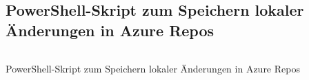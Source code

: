 %
\begin{appendices}
\renewcommand{\thefigure}{\Alph{figure}} %
%
%

\section*{PowerShell-Skript zum Speichern lokaler Änderungen in Azure Repos}
\begin{code}
    \inputminted{PowerShell}{Code/Commit-Files.ps1}
    \caption{PowerShell-Skript zum Speichern lokaler Änderungen in Azure Repos}
    \label{code:PowerShell-CommitFull}
\end{code}


\end{appendices}